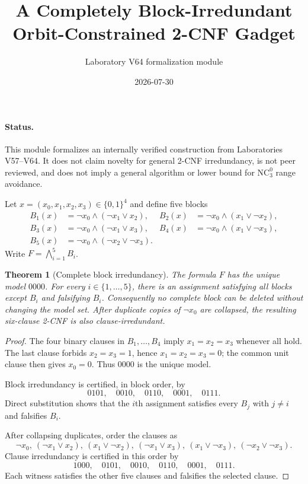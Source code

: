 \documentclass[11pt]{article}
\title{A Completely Block-Irredundant Orbit-Constrained 2-CNF Gadget}
\author{Laboratory V64 formalization module}
\date{2026-07-30}
\newtheorem{theorem}{Theorem}
\newcommand{\bits}{\{0,1\}}
\begin{document}
\maketitle

\paragraph{Status.}
This module formalizes an internally verified construction from Laboratories V57--V64.
It does not claim novelty for general 2-CNF irredundancy, is not peer reviewed, and does
not imply a general algorithm or lower bound for $\mathrm{NC}^{0}_{3}$ range avoidance.

Let $x=(x_0,x_1,x_2,x_3)\in\bits^4$ and define five blocks
\begin{align*}
B_1(x)&=\neg x_0\wedge(\neg x_1\vee x_2),&
B_2(x)&=\neg x_0\wedge(x_1\vee\neg x_2),\\
B_3(x)&=\neg x_0\wedge(\neg x_1\vee x_3),&
B_4(x)&=\neg x_0\wedge(x_1\vee\neg x_3),\\
B_5(x)&=\neg x_0\wedge(\neg x_2\vee\neg x_3).
\end{align*}
Write $F=\bigwedge_{i=1}^{5}B_i$.

\begin{theorem}[Complete block irredundancy]
The formula $F$ has the unique model $0000$. For every $i\in\{1,\ldots,5\}$,
there is an assignment satisfying all blocks except $B_i$ and falsifying $B_i$.
Consequently no complete block can be deleted without changing the model set.
After duplicate copies of $\neg x_0$ are collapsed, the resulting six-clause 2-CNF
is also clause-irredundant.
\end{theorem}

\begin{proof}
The four binary clauses in $B_1,\ldots,B_4$ imply $x_1=x_2=x_3$ whenever all hold.
The last clause forbids $x_2=x_3=1$, hence $x_1=x_2=x_3=0$; the common unit clause
then gives $x_0=0$. Thus $0000$ is the unique model.

Block irredundancy is certified, in block order, by
\[
0101,\quad 0010,\quad 0110,\quad 0001,\quad 0111.
\]
Direct substitution shows that the $i$th assignment satisfies every $B_j$ with
$j\ne i$ and falsifies $B_i$.

After collapsing duplicates, order the clauses as
\[
\neg x_0,\ (\neg x_1\vee x_2),\ (x_1\vee\neg x_2),\
(\neg x_1\vee x_3),\ (x_1\vee\neg x_3),\ (\neg x_2\vee\neg x_3).
\]
Clause irredundancy is certified in this order by
\[
1000,\quad 0101,\quad 0010,\quad 0110,\quad 0001,\quad 0111.
\]
Each witness satisfies the other five clauses and falsifies the selected clause.
\end{proof}
\end{document}
